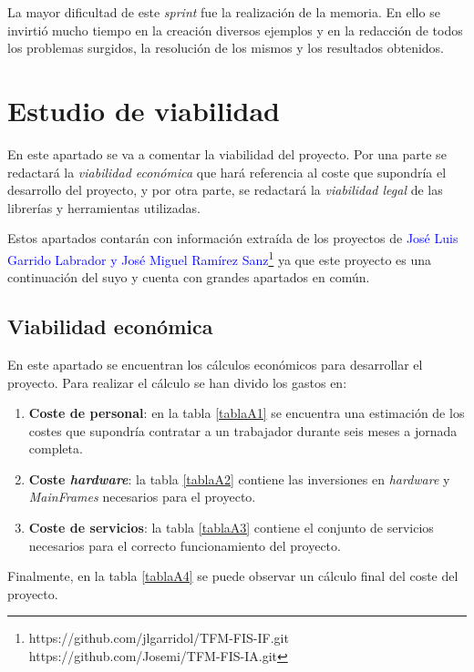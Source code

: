 La mayor dificultad de este \textit{sprint} fue la realización de la memoria. En ello se invirtió mucho tiempo en la creación diversos ejemplos y en la redacción de todos los problemas surgidos, la resolución de los mismos y los resultados obtenidos. 


\section{Estudio de viabilidad}
En este apartado se va a comentar la viabilidad del proyecto. Por una parte se redactará la \emph{viabilidad económica} que hará referencia al coste que supondría el desarrollo del proyecto, y por otra parte, se redactará la \emph{viabilidad legal} de las librerías y herramientas utilizadas. 

Estos apartados contarán con información extraída de los proyectos de \textcolor{blue}{José Luis Garrido Labrador y José Miguel Ramírez Sanz}\footnote{https://github.com/jlgarridol/TFM-FIS-IF.git \\ https://github.com/Josemi/TFM-FIS-IA.git} ya que este proyecto es una continuación del suyo y cuenta con grandes apartados en común.

\subsection{Viabilidad económica}

En este apartado se encuentran los cálculos económicos para desarrollar el proyecto. Para realizar el cálculo se han divido los gastos en:
\begin{enumerate}
    \item \textbf{Coste de personal}: en la tabla \ref{tablaA1} se encuentra una estimación de los costes que supondría contratar a un trabajador durante seis meses a jornada completa. 
    \item \textbf{Coste \textit{hardware}}: la tabla \ref{tablaA2} contiene las inversiones en \textit{hardware} y \textit{MainFrames} necesarios para el proyecto.
    \item \textbf{Coste de servicios}: la tabla \ref{tablaA3} contiene el conjunto de servicios necesarios para el correcto funcionamiento del proyecto.
\end{enumerate}

Finalmente, en la tabla \ref{tablaA4} se puede observar un cálculo final del coste del proyecto.

